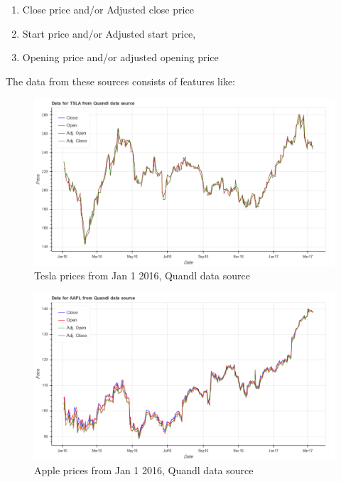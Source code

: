 \documentclass[12pt]{article}
\begin{document}
\begin{itemize}
\begin{enumerate}
\item Close price and/or Adjusted close price
\item Start price and/or Adjusted start price,
\item Opening price  and/or adjusted opening price
\end{enumerate}

The data from these sources consists of features like:


\begin{figure}[!htbp]
\begin{center}
\includegraphics[height=0.5\textheight,width=\textwidth]{price_plot_TSLA.png}
\caption{Tesla prices from Jan 1 2016, Quandl data source}
\label{fig:tsla}
\end{center}
\end{figure}

\begin{figure}[!htbp]
\begin{center}
\includegraphics[height=0.5\textheight,width=\textwidth]{price_plot_AAPL.png}
\caption{Apple prices from Jan 1 2016, Quandl data source}
\label{fig:aapl}
\end{center}
\end{figure}


\end{itemize}
\end{document}
